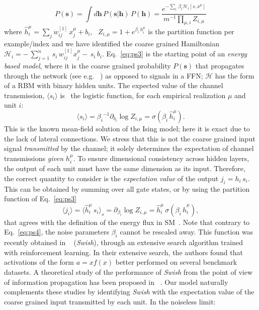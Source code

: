 \documentclass{article}
\begin{document}
%
\begin{equation} \label{eq:ps3}
P(\mathbf{s}) = \int d \mathbf{h} \, P(\mathbf{s} | \mathbf{h}) \, P(\mathbf{h}) =  \frac{e^{-\sum_i \, \beta_i \mathscr{H}_i[s, x^{\mu}]}}{m^{-1}\prod_{\mu,i} Z_{i, \mu}}
\end{equation}
%
where $\hat{h}^{\mu}_i = \sum_{j} w^{[1]}_{ij} \, x^{\mu}_j + b_i $, \,  $Z_{i, \mu}= 1+ e^{\beta_i \, h^{\mu}_i}$ is the partition function per example/index and we have identified the coarse grained Hamiltonian $\mathscr{H}_i = -  \, \sum_{j=1}^n \, s_i \, w^{[1]}_{ij} x^{\mu}_j -  \, s_i \, b_i$. Eq.~\eqref{eq:ps3} is the starting point of an {\it energy based model}, where it is the coarse grained probability $P(\mathbf{s})$ that propagates through the network (see e.g.~\cite{connie} ) as opposed to signals in a FFN; $\mathscr{H}$ has the form of a RBM with binary hidden units. The expected value of the channel transmission, $\langle s_i \rangle$ is~\cite{hertz} the logistic function, for each empirical realization $\mu$ and unit $i$:
%
\begin{equation} \label{eq:ps4}
\langle s_i \rangle = {\beta_i}^{-1} \partial_{b_i} \log Z_{i, \mu} =  \sigma(\beta_i \, \hat{h}^{\mu}_i).
\end{equation}
%
This is the known mean-field solution of the Ising model; here it is exact due to the lack of lateral connections. We stress that this is not the coarse grained input signal {\it transmitted} by the channel; it solely determines the expectation of channel transmissions {\it given} $h_i^{\mu}$. To ensure dimensional consistency across hidden layers, the output of each unit must have the same dimension as its input. Therefore, the correct quantity to consider is the {\it expectation value} of the output $j_i = h_i \, s_i $.  This can be  obtained by summing over all gate states, or by using the partition function of Eq.~\eqref{eq:ps3}
%
\begin{equation} \label{eq:ps5}
\langle j_i \rangle = \langle \hat{h}_i^{\mu} \, s_i \rangle_s = \partial_{\beta_i} \log{Z_{i,\mu}} = \hat{h}^{\mu}_i \, \sigma(\beta_i \, \hat{h}^{\mu}_i),
\end{equation}
%
that agrees with the definition of the energy flux in SM~\cite{bellac}. Note that contrary to Eq.~\eqref{eq:ps4}, the noise parameters $\beta_i$ cannot be rescaled away. This function was recently obtained in ~\cite{prajit} ({\it Swish}), through an extensive search algorithm trained with reinforcement learning. In their extensive search, the authors found that activations of the form $a = x f(x)$  better performed on several benchmark datasets. A theoretical study of the performance of {\it Swish} from the point of view of information propagation has been proposed in ~\cite{soufiane}.  Our model naturally complements these studies by identifying {\it Swish} with the expectation value of the coarse grained input transmitted by each unit. In the noiseless limit:
\end{document}
